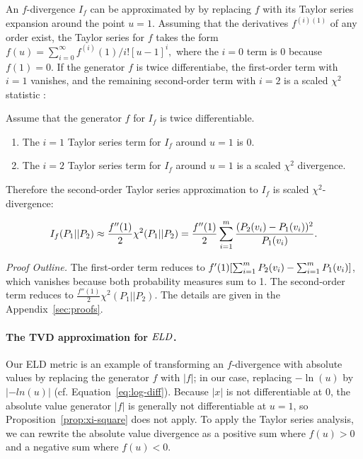 {An $f$-divergence $I_{f}$ can be approximated by  by replacing $f$ with its Taylor series expansion around the point $u=1$. Assuming that the derivatives $f^{(i)(1)}$ of any order exist, the Taylor series for $f$ takes the form $f(u) = \sum_{i=0}^{\infty} f^{(i)}(1)/i! [u-1]^{i},$ where the $i=0$ term is 0 because $f(1) = 0$. If the generator $f$ is twice differentiabe, the first-order term with $i=1$ vanishes, and the remaining second-order term with $i=2$ is a scaled $\chi^{2}$ statistic \cite{Nielsen2014}:

\begin{proposition} \label{prop:xi-square}
Assume that the generator $f$ for $I_{f}$ is twice differentiable.   

\begin{enumerate}
\item The $i=1$ Taylor series term for  $I_{f}$ around $u=1$ is 0.
\item The $i=2$ Taylor series term for  $I_{f}$ around $u=1$ is a scaled $\chi^{2}$ divergence.
\end{enumerate}


Therefore the second-order Taylor series approximation to $I_{f}$ is scaled $\chi^{2}$-divergence:

$$I_{f}(P_{1}||P_{2}) \approx \frac{f''(1)}{2} \chi^{2}(P_{1}||P_{2}) = \frac{f''(1)}{2} 
\sum_{i=1}^{m}  \frac{(P_{2}(v_{i})-P_{1}(v_{i}))^{2}}
 {P_{1}(v_{i})}.$$ 
\end{proposition} 
{\em Proof Outline.} 
The first-order term reduces to $f'(1) [\sum_{i=1}^{m} P_{2}(v_{i}) - \sum_{i=1}^{m} P_{1}(v_{i})]$, which vanishes because both probability measures sum to 1. The second-order term reduces to $ \frac{f''(1)}{2} \chi^{2}(P_{1}||P_{2})$. The details are given in the Appendix~\ref{sec:proofs}. 

\paragraph{The TVD approximation for $\it{ELD}$.}

Our ELD metric is an example of transforming an $f$-divergence with absolute values by replacing the generator $f$ with $|f|$; in our case, replacing $-\ln(u)$ by $|-ln(u)|$ (cf. Equation~\eqref{eq:log-diff}). Because $|x|$ is not differentiable at 0,  the absolute value generator $|f|$ is generally not differentiable at $u=1$, so Proposition~\ref{prop:xi-square} does not apply. To apply the Taylor series analysis, we can rewrite the absolute value divergence as a positive sum where $f(u)>0$ and a negative sum where $f(u) < 0$. 

}
